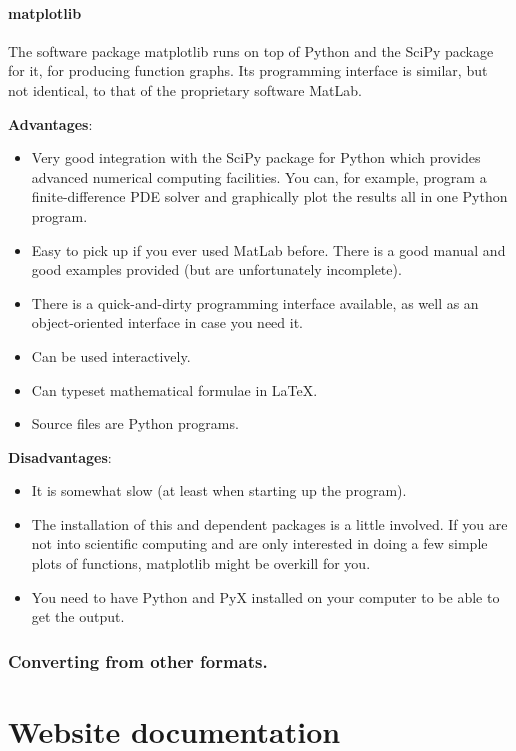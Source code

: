 \subsubsection*{matplotlib}

The software package matplotlib runs on top of Python and the SciPy package for it, for producing function graphs. Its programming interface is similar, but not identical, to that of the proprietary software MatLab.

\textbf{Advantages}:
\begin{itemize}
\item
Very good integration with the SciPy package for Python which provides advanced numerical computing facilities. You can, for example, program a finite-difference PDE solver and graphically plot the results all in one Python program.
\item
Easy to pick up if you ever used MatLab before. There is a good manual and good examples provided (but are unfortunately incomplete).
\item
There is a quick-and-dirty programming interface available, as well as an object-oriented interface in case you need it.
\item
Can be used interactively.
\item
Can typeset mathematical formulae in LaTeX.
\item
Source files are Python programs.
\end{itemize}

\textbf{Disadvantages}:
\begin{itemize}
\item
It is somewhat slow (at least when starting up the program).
\item
The installation of this and dependent packages is a little involved. If you are not into scientific computing and are only interested in doing a few simple plots of functions, matplotlib might be overkill for you.
\item
You need to have Python and PyX installed on your computer to be able to get the output.
\end{itemize}

\subsection*{Converting from other formats.} \label{gfxformats}



\chapter{Website documentation}

